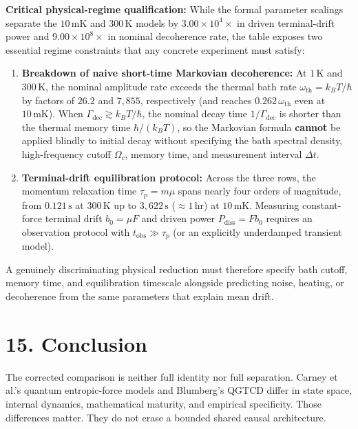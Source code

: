 \documentclass[
  american,
  11pt,
  letterpaper,
]{article}
\providecommand{\tightlist}{%
  \setlength{\itemsep}{0pt}\setlength{\parskip}{0pt}}
\begin{document}
\textbf{Critical physical-regime qualification:} While the formal parameter scalings separate the \(10\,\mathrm{mK}\) and \(300\,\mathrm{K}\) models by \(3.00 \times 10^4\times\) in driven terminal-drift power and \(9.00 \times 10^8\times\) in nominal decoherence rate, the table exposes two essential regime constraints that any concrete experiment must satisfy:

\begin{enumerate}
\def\labelenumi{\arabic{enumi}.}
\tightlist
\item
  \textbf{Breakdown of naive short-time Markovian decoherence:} At \(1\,\mathrm{K}\) and \(300\,\mathrm{K}\), the nominal amplitude rate exceeds the thermal bath rate \(\omega_{\mathrm{th}} = k_B T/\hbar\) by factors of \(26.2\) and \textbf{\(7{,}855\)}, respectively (and reaches \(0.262\,\omega_{\mathrm{th}}\) even at \(10\,\mathrm{mK}\)). When \(\Gamma_{\mathrm{dec}} \gtrsim k_B T/\hbar\), the nominal decay time \(1/\Gamma_{\mathrm{dec}}\) is shorter than the thermal memory time \(\hbar/(k_B T)\), so the Markovian formula \textbf{cannot} be applied blindly to initial decay without specifying the bath spectral density, high-frequency cutoff \(\Omega_c\), memory time, and measurement interval \(\Delta t\).
\item
  \textbf{Terminal-drift equilibration protocol:} Across the three rows, the momentum relaxation time \(\tau_p = m\mu\) spans nearly four orders of magnitude, from \(0.121\,\mathrm{s}\) at \(300\,\mathrm{K}\) up to \(3{,}622\,\mathrm{s}\) (\(\approx 1\,\mathrm{hr}\)) at \(10\,\mathrm{mK}\). Measuring constant-force terminal drift \(b_0 = \mu F\) and driven power \(P_{\mathrm{diss}} = F b_0\) requires an observation protocol with \(t_{\mathrm{obs}} \gg \tau_p\) (or an explicitly underdamped transient model).
\end{enumerate}

A genuinely discriminating physical reduction must therefore specify bath cutoff, memory time, and equilibration timescale alongside predicting noise, heating, or decoherence from the same parameters that explain mean drift.

\section{15. Conclusion}\label{conclusion}

The corrected comparison is neither full identity nor full separation. Carney et al.'s quantum entropic-force models and Blumberg's QGTCD differ in state space, internal dynamics, mathematical maturity, and empirical specificity. Those differences matter. They do not erase a bounded shared causal architecture.
\end{document}
